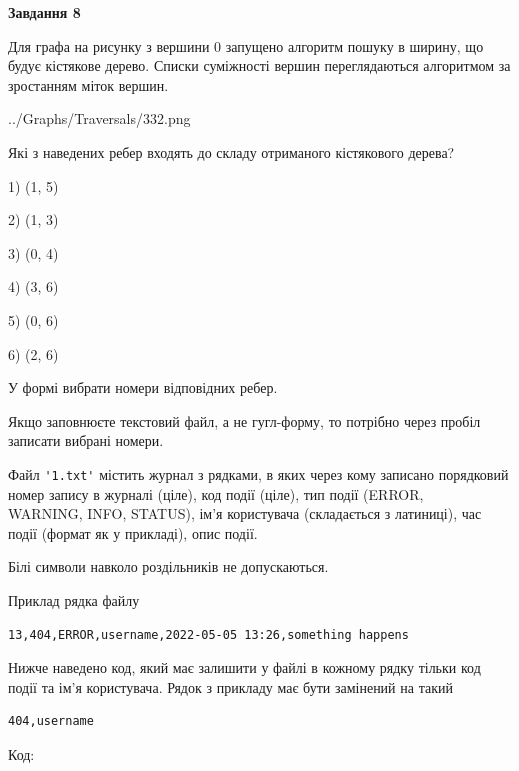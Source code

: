 \documentclass[12pt, ukrainian]{article}
\def\code#1{\Verb!#1!}
\begin{document}
{\begin {large}
{\begin {center}\textbf{Завдання 8}\end {center}}\par
Для графа на рисунку з вершини 0 запущено алгоритм пошуку в ширину, що будує кістякове дерево. Списки суміжності вершин переглядаються алгоритмом за зростанням міток вершин.\par
\begin{center}
	{../Graphs/Traversals/332.png}
\end{center}
\par Які з наведених ребер входять до складу отриманого кістякового дерева?\par
1) (1, 5)\par
2) (1, 3)\par
3) (0, 4)\par
4) (3, 6)\par
5) (0, 6)\par
6) (2, 6)\par
{\vskip 15pt} У формі вибрати номери відповідних ребер.


Якщо заповнюєте текстовий файл, а не гугл-форму, то потрібно через пробіл записа\-ти вибрані номери.\par
\newpage


Файл \code{'1.txt'} містить журнал з рядками, в яких через кому записано поряд\-ко\-вий номер запису в журналі (ціле), код події (ціле), тип події (ERROR, \\WARNING, INFO, STATUS), ім'я користувача (складається з латиниці), час події (фор\-мат як у прикладі), опис події.

Білі символи навколо роздільників не допускаються.

Приклад рядка файлу



\begin{verbatim}
13,404,ERROR,username,2022-05-05 13:26,something happens
\end{verbatim}


Нижче наведено код, який має залишити у файлі в кожному рядку тільки код події та ім'я користувача. Рядок з прикладу має бути замінений на такий



\begin{verbatim}
404,username
\end{verbatim}




Код:




\end{large}}
\end{document}
